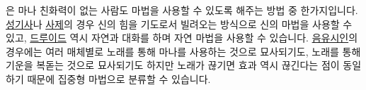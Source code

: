 \documentclass{report}
\begin{document}
	은 마나 친화력이 없는 사람도 마법을 사용할 수 있도록 해주는 방법 중 한가지입니다. \hyperlink{class:paladin}{성기사}나 \hyperlink{class:cleric}{사제}의 경우 신의 힘을 기도로서 빌려오는 방식으로 신의 마법을 사용할 수 있고, \hyperlink{class:druid}{드루이드} 역시 자연과 대화를 하며 자연 마법을 사용할 수 있습니다. \hyperlink{class:bard}{음유시인}의 경우에는 여러 매체별로 노래를 통해 마나를 사용하는 것으로 묘사되기도, 노래를 통해 기운을 복돋는 것으로 묘사되기도 하지만 노래가 끊기면 효과 역시 끊긴다는 점이 동일하기 때문에 집중형 마법으로 분류할 수 있습니다.
\end{document}
